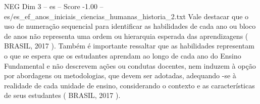 \begin{textsample}{NEG Dim 3 – es – Score -1.00 – es/es\_ef\_anos\_iniciais\_ciencias\_humanas\_historia\_2.txt}
Vale destacar que o uso de numeração sequencial para identificar as habilidades de cada ano ou bloco de anos não representa uma ordem ou hierarquia esperada das aprendizagens ( BRASIL, 2017 ).
Também é importante ressaltar que as habilidades representam o que se espera que os estudantes aprendam ao longo de cada ano do Ensino Fundamental e não descrevem ações ou condutas docentes, nem induzem à opção por abordagens ou metodologias, que devem ser adotadas, adequando -se à realidade de cada unidade de ensino, considerando o contexto e as características de seus estudantes ( BRASIL, 2017 ).

\end{textsample}
